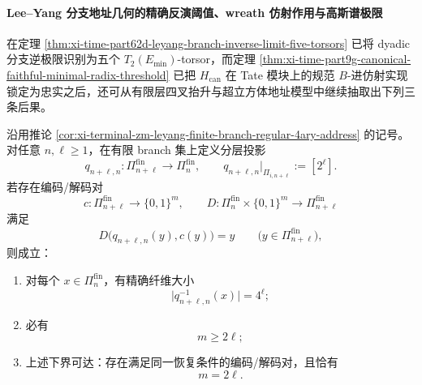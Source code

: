 \paragraph{Lee--Yang 分支地址几何的精确反演阈值、wreath 仿射作用与高斯谱极限}
在定理 \ref{thm:xi-time-part62d-leyang-branch-inverse-limit-five-torsors} 已将 dyadic 分支逆极限识别为五个 \(T_2(E_{\min})\)-torsor，而定理 \ref{thm:xi-time-part9g-canonical-faithful-minimal-radix-threshold} 已把 \(H_{\mathrm{can}}\) 在 Tate 模块上的规范 \(B\)-进仿射实现锁定为忠实之后，还可从有限层四叉抬升与超立方体地址模型中继续抽取出下列三条后果。

\begin{theorem}\label{thm:xi-time-part62d-leyang-lstep-oracle-budget}
沿用推论 \ref{cor:xi-terminal-zm-leyang-finite-branch-regular-4ary-address} 的记号。对任意 \(n,\ell\ge 1\)，在有限 branch 集上定义分层投影
\[
q_{n+\ell,n}:\Pi_{n+\ell}^{\mathrm{fin}}\longrightarrow \Pi_n^{\mathrm{fin}},
\qquad
q_{n+\ell,n}\big|_{\Pi_{i,n+\ell}}:=[2^\ell].
\]
若存在编码/解码对
\[
c:\Pi_{n+\ell}^{\mathrm{fin}}\to \{0,1\}^{m},
\qquad
D:\Pi_n^{\mathrm{fin}}\times \{0,1\}^{m}\to \Pi_{n+\ell}^{\mathrm{fin}}
\]
满足
\[
D\bigl(q_{n+\ell,n}(y),c(y)\bigr)=y
\qquad
\bigl(y\in \Pi_{n+\ell}^{\mathrm{fin}}\bigr),
\]
则成立：
\begin{enumerate}
  \item 对每个 \(x\in \Pi_n^{\mathrm{fin}}\)，有精确纤维大小
  \[
  \bigl|q_{n+\ell,n}^{-1}(x)\bigr|=4^\ell;
  \]
  \item 必有
  \[
  m\ge 2\ell;
  \]
  \item 上述下界可达：存在满足同一恢复条件的编码/解码对，且恰有
  \[
  m=2\ell.
  \]
\end{enumerate}
\end{theorem}
